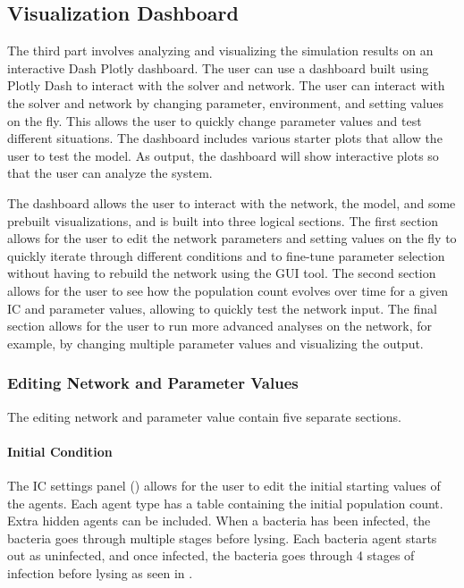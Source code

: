\subsection{Visualization Dashboard}
\label{sec:visualization_framework}
The third part involves analyzing and visualizing the simulation results on an interactive Dash Plotly \cite{DashDocumentationUser} dashboard. 
The user can use a dashboard built using Plotly Dash to interact with the solver and network.
The user can interact with the solver and network by changing parameter, environment, and setting values on the fly.
This allows the user to quickly change parameter values and test different situations.
The dashboard includes various starter plots that allow the user to test the model.
As output, the dashboard will show interactive plots so that the user can analyze the system. 

The dashboard allows the user to interact with the network, the model, and some prebuilt visualizations, and is built into three logical sections.
The first section allows for the user to edit the network parameters and setting values on the fly to quickly iterate through different conditions and to fine-tune parameter selection without having to rebuild the network using the GUI tool.
The second section allows for the user to see how the population count evolves over time for a given IC and parameter values, allowing to quickly test the network input.
The final section allows for the user to run more advanced analyses on the network, for example, by changing multiple parameter values and visualizing the output. 

\subsubsection{Editing Network and Parameter Values}
\label{sec:editing_network_and_parameter_values}
The editing network and parameter value contain five separate sections.
\paragraph{Initial Condition}
The IC settings panel () allows for the user to edit the initial starting values of the agents. 
Each agent type has a table containing the initial population count. 
Extra hidden agents can be included. 
When a bacteria has been infected, the bacteria goes through multiple stages before lysing. Each bacteria agent starts out as uninfected, and once infected, the bacteria goes through 4 stages of infection before lysing as seen in .  
